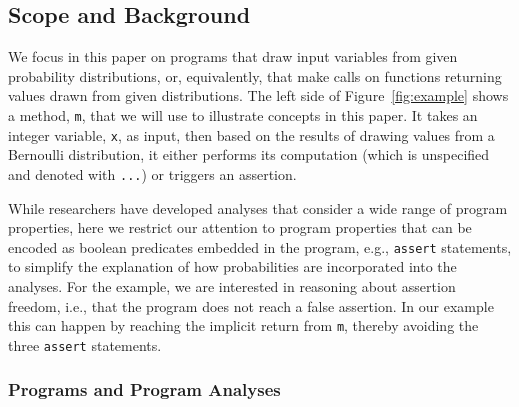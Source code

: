 \subsection{Scope and Background}
\label{sec:background}



We focus in this paper on programs that draw input variables
from given probability distributions, or, equivalently, that make
calls on functions returning values drawn from given distributions.
The left side of Figure~\ref{fig:example} shows a method,
\texttt{m}, that we will use to illustrate concepts in this paper.     
It takes an integer variable, \texttt{x}, as input, then based on the 
results of drawing values from a Bernoulli distribution,
it either performs its computation
(which is unspecified and denoted with \texttt{...}) or triggers
an assertion. 

While researchers have developed analyses that consider a wide
range of program properties, here
we restrict our attention to program
properties that can be encoded as boolean predicates 
embedded in the program,
e.g., \texttt{assert} statements, to simplify the explanation
of how probabilities are incorporated into the analyses.
For the example, we are interested in reasoning about
assertion freedom, i.e., that the program does
not reach a false assertion.
In our example
this can happen by reaching the implicit return from \texttt{m},
thereby avoiding the three \texttt{assert} statements.


\subsubsection{Programs and Program Analyses}

